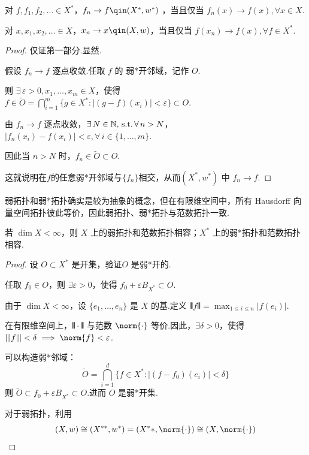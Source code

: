 \begin{proposition}
    对 $f, f_1, f_2, \dots \in X^*$，$f_n \to f\qin (X^*, w^*)$ ，当且仅当 $f_n(x) \to f(x), \forall x \in X$.\par
    对 $x, x_1, x_2, \dots \in X$，$x_n \to x\qin (X, w)$，当且仅当 $f(x_n) \to f(x), \forall f \in X^*$.
\end{proposition}
\begin{proof}
    仅证第一部分.\fbox{$\Rightarrow$}显然.\par
    \fbox{$\Leftarrow$}假设 $f_n \to f$ 逐点收敛.任取 $f$ 的 弱*开邻域，记作 $O$.\par
    则 $\exists\,\varepsilon > 0, x_1, \dots, x_m \in X$，使得 $f \in \tilde{O} = \bigcap_{i=1}^m \{g \in X^* : |(g-f)(x_i)| < \varepsilon\} \subset O$.\par
    由 $f_n \to f$ 逐点收敛，$\exists\, N \in \mathbb{N},\operatorname{\,\text{s.t.}}\forall\, n > N$，$|f_n(x_i) - f(x_i)| < \varepsilon,\forall\,i \in \{1, \dots, m\}$.\par
    因此当 $n > N$ 时，$f_n \in \tilde{O} \subset O$.\par
    这就说明在$f$的任意弱*开邻域与$\{f_n\}$相交，从而$(X^*, w^*)$ 中 $f_n \to f$.
\end{proof}

弱拓扑和弱*拓扑确实是较为抽象的概念，但在有限维空间中，所有 Hausdorff 向量空间拓扑彼此等价，因此弱拓扑、弱*拓扑与范数拓扑一致.

\begin{proposition}
    若 $\dim X < \infty$，则 $X$ 上的弱拓扑和范数拓扑相容；$X^*$ 上的弱*拓扑和范数拓扑相容.
\end{proposition}
\begin{proof}
    设 $O \subset X^*$ 是开集，验证$O$ 是弱*开的.\par
    任取 $f_0 \in O$，则 $\exists \varepsilon > 0$，使得 $f_0 + \varepsilon B_{X^*} \subset O$.\par
    由于 $\dim X < \infty$，设 $\{e_1, \dots, e_n\}$ 是 $X$ 的基.定义 $\interleave f \interleave = \max_{1 \leq i \leq n} |f(e_i)|$.\par
    在有限维空间上，$\interleave \cdot \interleave$ 与范数 $\norm{\cdot}$ 等价.因此，$\exists \delta > 0$，使得 $\interleave f \interleave < \delta \implies \norm{f} < \varepsilon$.\par
    可以构造弱*邻域：
    \begin{equation*}
        \tilde{O} = \bigcap_{i=1}^d \{f \in X^* : |(f- f_0)(e_i)| < \delta\}
    \end{equation*}
    则 $\tilde{O} \subset f_0 + \varepsilon B_{X^*} \subset O$.进而 $O$ 是弱*开集.\par
    对于弱拓扑，利用
    \begin{equation*}
        (X,w)\cong (X^{**}, w^*)=(X^**, \norm{\cdot})\cong (X,\norm{\cdot})\qedhere 
    \end{equation*}
\end{proof}

